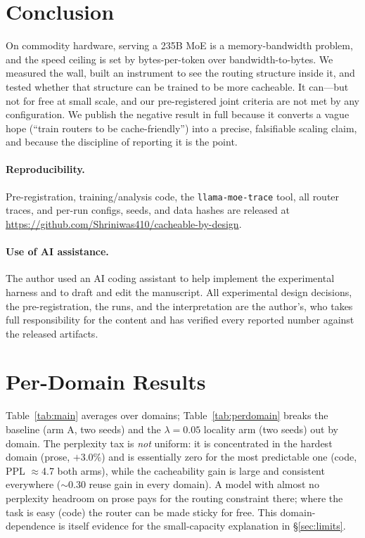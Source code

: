 \documentclass[11pt]{article}
\begin{document}
\section{Conclusion}
On commodity hardware, serving a 235B MoE is a memory-bandwidth problem, and the
speed ceiling is set by bytes-per-token over bandwidth-to-bytes. We measured the
wall, built an instrument to see the routing structure inside it, and tested
whether that structure can be trained to be more cacheable. It can---but not for
free at small scale, and our pre-registered joint criteria are not met by any
configuration. We publish the negative result in full because it converts a
vague hope (``train routers to be cache-friendly'') into a precise, falsifiable
scaling claim, and because the discipline of reporting it is the point.

\paragraph{Reproducibility.} Pre-registration, training/analysis code, the
\texttt{llama-moe-trace} tool, all router traces, and per-run configs, seeds,
and data hashes are released at \url{https://github.com/Shriniwas410/cacheable-by-design}.

\paragraph{Use of AI assistance.} The author used an AI coding assistant to help
implement the experimental harness and to draft and edit the manuscript. All
experimental design decisions, the pre-registration, the runs, and the
interpretation are the author's, who takes full responsibility for the content
and has verified every reported number against the released artifacts.

\appendix
\section{Per-Domain Results}
\label{app:perdomain}
Table~\ref{tab:main} averages over domains; Table~\ref{tab:perdomain} breaks the
baseline (arm A, two seeds) and the $\lambda{=}0.05$ locality arm (two seeds)
out by domain. The perplexity tax is \emph{not} uniform: it is concentrated in
the hardest domain (prose, $+$3.0\%) and is essentially zero for the most
predictable one (code, PPL $\approx$4.7 both arms), while the cacheability gain
is large and consistent everywhere ($\sim$0.30 reuse gain in every domain). A
model with almost no perplexity headroom on prose pays for the routing
constraint there; where the task is easy (code) the router can be made sticky
for free. This domain-dependence is itself evidence for the small-capacity
explanation in \S\ref{sec:limits}.
\end{document}

